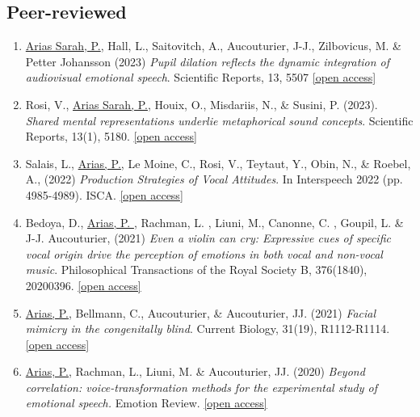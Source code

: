 \documentclass[a4paper, 11pt]{article}
\begin{document}
\subsection*{Peer-reviewed}
\begin{enumerate}[1.]
\item \ul{Arias Sarah, P.}, Hall, L., Saitovitch, A., Aucouturier, J-J., Zilbovicus, M. \& Petter Johansson  (2023) \emph{Pupil dilation reflects the dynamic integration of audiovisual emotional speech}. Scientific Reports, 13, 5507 {\footnotesize \href{https://www.nature.com/articles/s41598-023-32133-2}{[open access]}}

\item Rosi, V., \ul{Arias Sarah, P.}, Houix, O., Misdariis, N., \& Susini, P. (2023). \emph{Shared mental representations underlie metaphorical sound concepts}. Scientific Reports, 13(1), 5180. {\footnotesize \href{https://www.researchgate.net/profile/Victor-Rosi/publication/365198614_Shared_Mental_Representations_Underlie_Metaphorical_Sound_Concepts/links/636a3a5954eb5f547cb30de1/Shared-Mental-Representations-Underlie-Metaphorical-Sound-Concepts.pdf}{[open access]} }


\item Salais, L., \ul{Arias, P.}, Le Moine, C., Rosi, V., Teytaut, Y., Obin, N., \& Roebel, A., (2022) \emph{Production Strategies of Vocal Attitudes}. In Interspeech 2022 (pp. 4985-4989). ISCA. {\footnotesize  \href{https://www.researchgate.net/profile/Clement-Le-Moine/publication/359982566_Production_Strategies_of_Vocal_Attitudes/links/62599cefa279ec5dd7f91c3f/Production-Strategies-of-Vocal-Attitudes.pdf}{[open access]}}


\item Bedoya, D., \ul{Arias, P. }, Rachman, L. , Liuni, M., Canonne, C. , Goupil, L. \& J-J. Aucouturier, (2021) \emph{Even a violin can cry: Expressive cues of specific vocal origin drive the perception of emotions in both vocal and non-vocal music}. Philosophical Transactions of the Royal Society B, 376(1840), 20200396. {\footnotesize \href{https://royalsocietypublishing.org/doi/pdf/10.1098/rstb.2020.0396}{[open access]}}

\item \ul{Arias, P.}, Bellmann, C., Aucouturier, \& Aucouturier, JJ. (2021) \emph{Facial mimicry in the congenitally blind}. Current Biology, 31(19), R1112-R1114. {\footnotesize \href{https://hal.archives-ouvertes.fr/hal-03391957/document}{[open access]}}

\item \ul{Arias, P.}, Rachman, L., Liuni, M. \& Aucouturier, JJ. (2020) \emph{Beyond correlation: voice-transformation methods for the experimental study of emotional speech.} Emotion Review. {\footnotesize \href{https://hal.archives-ouvertes.fr/hal-02907502/document}{[open access]}}


\end{enumerate}
\end{document}
